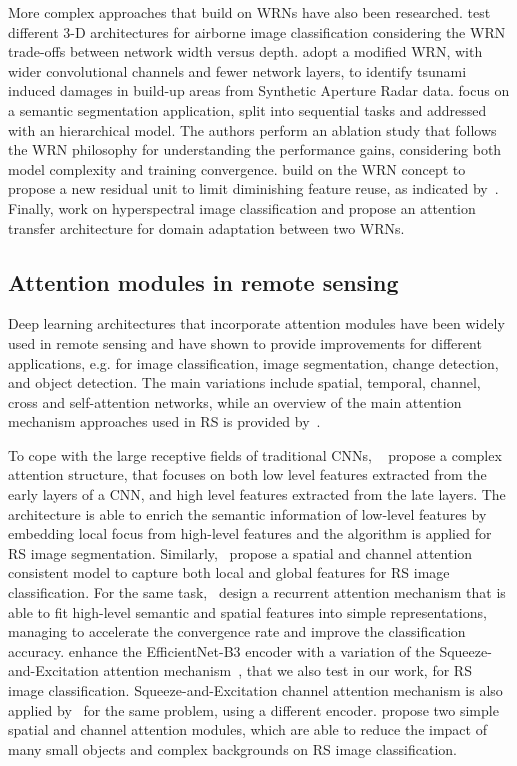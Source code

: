 \documentclass[journal]{IEEEtran}
\begin{document}
More complex approaches that build on WRNs have also been researched. \cite{8344565} test different 3-D architectures for airborne image classification considering the WRN trade-offs between network width versus depth. \cite{8126255} adopt a modified WRN, with wider convolutional channels and fewer network layers, to identify tsunami induced damages in build-up areas from Synthetic Aperture Radar data. \cite{DIAKOGIANNIS202094} focus on a semantic segmentation application, split into sequential tasks and addressed with an hierarchical model. The authors perform an ablation study that follows the WRN philosophy for understanding the performance gains, considering both model complexity and training convergence. \cite{8917718} build on the WRN concept to propose a new residual unit to limit diminishing feature reuse, as indicated by~\cite{DBLP:journals/corr/ZagoruykoK16}. Finally, \cite{8898850} work on hyperspectral image classification and propose an attention transfer architecture for domain adaptation between two WRNs.

\subsection{Attention modules in remote sensing}

Deep learning architectures that incorporate attention modules have been widely used in remote sensing and have shown to provide improvements for different applications, e.g.  for image classification, image segmentation, change detection, and object detection. The main variations include spatial, temporal, channel, cross and self-attention networks, while an overview of the main attention mechanism approaches used in RS is provided by~\cite{ghaffarian2021effect}.

To cope with the large receptive fields of traditional CNNs, ~\cite{ding2020lanet} propose a complex attention structure, that focuses on both low level features extracted from the early layers of a CNN, and high level features extracted from the late layers. The architecture is able to enrich the semantic information of low-level features by embedding local focus from high-level features and the algorithm is applied for RS image segmentation. Similarly,~\cite{9324913} propose a spatial and channel attention consistent model to capture both local and global features for RS image classification. For the same task,~\cite{8454883} design a recurrent attention mechanism that is able to fit high-level semantic and spatial features into simple representations, managing to accelerate the convergence rate and improve the classification accuracy. \cite{alhichri2021classification} enhance the EfficientNet-B3 encoder with a variation of the Squeeze-and-Excitation attention mechanism~\citep{Hu_2018_CVPR}, that we also test in our work, for RS image classification. Squeeze-and-Excitation channel attention mechanism is also applied by~\cite{tong2020channel} for the same problem, using a different encoder. \cite{zhao2020remote} propose two simple spatial and channel attention modules, which are able to reduce the impact of many small objects and complex backgrounds on RS image classification. 
\end{document}
